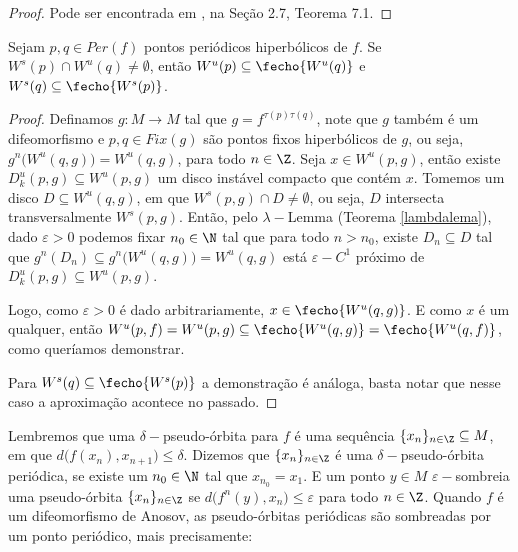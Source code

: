 \begin{proof} Pode ser encontrada em \cite{jacob}, na Seção 2.7, Teorema 7.1.
\end{proof}

\begin{corolario}\label{wproximo} Sejam $p,q\in Per(f)$ pontos periódicos hiperbólicos de $f$. Se $W^s(p)\cap W^u(q)\neq\emptyset$, então $W^u(p)\subseteq \fecho{W^u(q)}$ e $W^s(q)\subseteq \fecho{W^s(p)}$.
\end{corolario}

\begin{proof} Definamos $g:M\to M$ tal que $g=f^{\tau(p)\tau(q)}$, note que $g$ também é um difeomorfismo e $p,q\in Fix(g)$ são pontos fixos hiperbólicos de $g$, ou seja, $g^n\big(W^u(q,g)\big)=W^u(q,g)$, para todo $n\in\Z$. Seja $x\in W^u(p,g)$, então existe $D^u_k(p,g)\subseteq W^u(p,g)$ um disco instável compacto que contém $x$. Tomemos um disco $D\subseteq W^u(q,g)$, em que $W^s(p,g)\cap D\neq\emptyset$, ou seja, $D$ intersecta transversalmente $W^s(p,g)$. Então, pelo $\lambda-$Lemma (Teorema \ref{lambdalema}), dado $\varepsilon>0$ podemos fixar $n_0\in\N$ tal que para todo $n>n_0$, existe $D_n\subseteq D$ tal que $g^n(D_n)\subseteq g^n\big(W^u(q,g)\big)=W^u(q,g)$ está $\varepsilon-C^1$ próximo de $D^u_k(p,g)\subseteq W^u(p,g)$. 

Logo, como $\varepsilon>0$ é dado arbitrariamente, $x\in\fecho{W^u(q,g)}$. E como $x$ é um qualquer, então $W^u(p,f)=W^u(p,g)\subseteq \fecho{W^u(q,g)}=\fecho{W^u(q,f)}$, como queríamos demonstrar.

Para $W^s(q)\subseteq \fecho{W^s(p)}$ a demonstração é análoga, basta notar que nesse caso a aproximação acontece no passado.
\end{proof}

%

Lembremos que uma $\delta-$pseudo-órbita para $f$ é uma sequência $\{x_n\}_{n\in\Z}\subseteq M$, em que $d\big(f(x_n),x_{n+1}\big)\leq\delta$. Dizemos que $\{x_n\}_{n\in\Z}$ é uma $\delta-$pseudo-órbita periódica, se existe um $n_0\in\N$ tal que $x_{n_0}=x_1$. E um ponto $y\in M$ $\varepsilon-$sombreia uma pseudo-órbita $\{x_n\}_{n\in\Z}$ se $d\big(f^n(y),x_{n}\big)\leq\varepsilon$ para todo $n\in\Z$. Quando $f$ é um difeomorfismo de Anosov, as pseudo-órbitas periódicas são sombreadas por um ponto periódico, mais precisamente:

